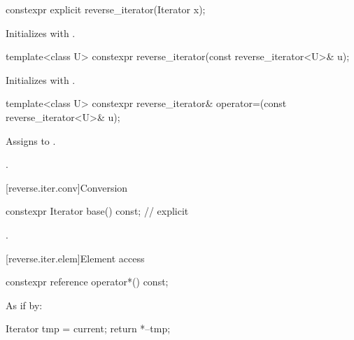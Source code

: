 %
\begin{itemdecl}
constexpr explicit reverse_iterator(Iterator x);
\end{itemdecl}

\begin{itemdescr}
\pnum
\effects
Initializes
with .
\end{itemdescr}

%
\begin{itemdecl}
template<class U> constexpr reverse_iterator(const reverse_iterator<U>& u);
\end{itemdecl}

\begin{itemdescr}
\pnum
\effects
Initializes
with
.
\end{itemdescr}

%
\begin{itemdecl}
template<class U>
  constexpr reverse_iterator&
    operator=(const reverse_iterator<U>& u);
\end{itemdecl}

\begin{itemdescr}
\pnum
\effects
Assigns  to .

\pnum
\returns
{}.
\end{itemdescr}

[reverse.iter.conv]{Conversion}

%
\begin{itemdecl}
constexpr Iterator base() const;          // explicit
\end{itemdecl}

\begin{itemdescr}
\pnum
\returns
{}.
\end{itemdescr}

[reverse.iter.elem]{Element access}

%
\begin{itemdecl}
constexpr reference operator*() const;
\end{itemdecl}

\begin{itemdescr}
\pnum
\effects
As if by:
\begin{codeblock}
Iterator tmp = current;
return *--tmp;
\end{codeblock}

\end{itemdescr}

